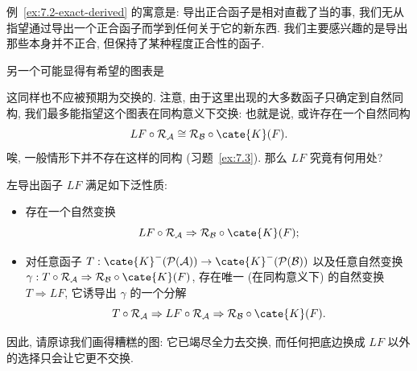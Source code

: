例~\ref{ex:7.2-exact-derived} 的寓意是: 导出正合函子是相对直截了当的事, 我们无从指望通过导出一个正合函子而学到任何关于它的新东西. 我们主要感兴趣的是导出那些本身并不正合, 但保持了某种程度正合性的函子.

另一个可能显得有希望的图表是
\begin{center}
\end{center}
这同样也不应被预期为交换的. 注意, 由于这里出现的大多数函子只确定到自然同构, 我们最多能指望这个图表在同构意义下交换: 也就是说, 或许存在一个自然同构
\[
L F\circ\mathcal{R}_{\mathcal{A}}\cong \mathcal{R}_{\mathcal{B}}\circ\cate{K}(F).
\]
唉, 一般情形下并不存在这样的同构 (习题~\ref{ex:7.3}). 那么 $L F$ 究竟有何用处?

\begin{proposition}\label{prop:7.3-universal}
左导出函子 $L F$ 满足如下泛性质:
\begin{itemize}
\item 存在一个自然变换
\[
L F\circ\mathcal{R}_{\mathcal{A}} \Rightarrow \mathcal{R}_{\mathcal{B}}\circ\cate{K}(F);
\]
\item 对任意函子 $T:\cate{K}^-(\mathcal{P}(\mathcal{A}))\to\cate{K}^-(\mathcal{P}(\mathcal{B}))$ 以及任意自然变换 $\gamma:T\circ\mathcal{R}_{\mathcal{A}}\Rightarrow \mathcal{R}_{\mathcal{B}}\circ\cate{K}(F)$, 存在唯一 (在同构意义下) 的自然变换 $T\Rightarrow L F$, 它诱导出 $\gamma$ 的一个分解
\[
T\circ\mathcal{R}_{\mathcal{A}}\Rightarrow L F\circ\mathcal{R}_{\mathcal{A}}\Rightarrow \mathcal{R}_{\mathcal{B}}\circ\cate{K}(F).
\]
\end{itemize}
因此, 请原谅我们画得糟糕的图: 它已竭尽全力去交换, 而任何把底边换成 $L F$ 以外的选择只会让它更不交换.
\end{proposition}

